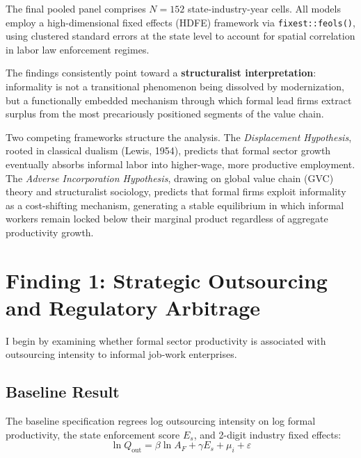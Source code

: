 \documentclass[12pt, a4paper]{article}
\begin{document}
The final pooled panel comprises $N=152$ state-industry-year cells. All models employ a high-dimensional fixed effects (HDFE) framework via \texttt{fixest::feols()}, using clustered standard errors at the state level to account for spatial correlation in labor law enforcement regimes.

The findings consistently point toward a \textbf{structuralist interpretation}: informality is not a transitional phenomenon being dissolved by modernization, but a functionally embedded mechanism through which formal lead firms extract surplus from the most precariously positioned segments of the value chain.

\medskip
\noindent Two competing frameworks structure the analysis. The \textit{Displacement Hypothesis}, rooted in classical dualism (Lewis, 1954), predicts that formal sector growth eventually absorbs informal labor into higher-wage, more productive employment. The \textit{Adverse Incorporation Hypothesis}, drawing on global value chain (GVC) theory and structuralist sociology, predicts that formal firms exploit informality as a cost-shifting mechanism, generating a stable equilibrium in which informal workers remain locked below their marginal product regardless of aggregate productivity growth.

\section{Finding 1: Strategic Outsourcing and Regulatory Arbitrage}

I begin by examining whether formal sector productivity is associated with outsourcing intensity to informal job-work enterprises.

\subsection{Baseline Result}

The baseline specification regrees log outsourcing intensity on log formal productivity, the state enforcement score $E_s$, and 2-digit industry fixed effects:
\begin{equation}
  \ln Q_{\text{out}} = \beta \ln A_{F} + \gamma E_s + \mu_i + \varepsilon
\end{equation}
\end{document}
